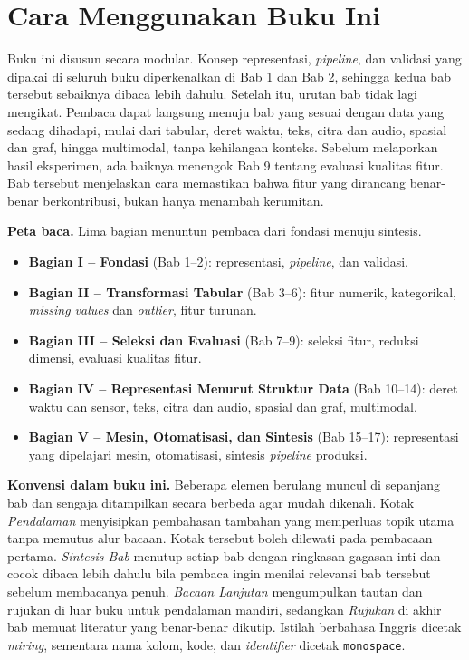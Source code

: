 \chapter*{Cara Menggunakan Buku Ini}

Buku ini disusun secara modular. Konsep representasi, \emph{pipeline}, dan validasi yang dipakai di seluruh buku diperkenalkan di Bab 1 dan Bab 2, sehingga kedua bab tersebut sebaiknya dibaca lebih dahulu. Setelah itu, urutan bab tidak lagi mengikat. Pembaca dapat langsung menuju bab yang sesuai dengan data yang sedang dihadapi, mulai dari tabular, deret waktu, teks, citra dan audio, spasial dan graf, hingga multimodal, tanpa kehilangan konteks. Sebelum melaporkan hasil eksperimen, ada baiknya menengok Bab 9 tentang evaluasi kualitas fitur. Bab tersebut menjelaskan cara memastikan bahwa fitur yang dirancang benar-benar berkontribusi, bukan hanya menambah kerumitan.

\textbf{Peta baca.} Lima bagian menuntun pembaca dari fondasi menuju sintesis.

\begin{itemize}
\tightlist
\item
  \textbf{Bagian I -- Fondasi} (Bab 1--2): representasi, \emph{pipeline}, dan validasi.
\item
  \textbf{Bagian II -- Transformasi Tabular} (Bab 3--6): fitur numerik, kategorikal, \emph{missing values} dan \emph{outlier}, fitur turunan.
\item
  \textbf{Bagian III -- Seleksi dan Evaluasi} (Bab 7--9): seleksi fitur, reduksi dimensi, evaluasi kualitas fitur.
\item
  \textbf{Bagian IV -- Representasi Menurut Struktur Data} (Bab 10--14): deret waktu dan sensor, teks, citra dan audio, spasial dan graf, multimodal.
\item
  \textbf{Bagian V -- Mesin, Otomatisasi, dan Sintesis} (Bab 15--17): representasi yang dipelajari mesin, otomatisasi, sintesis \emph{pipeline} produksi.
\end{itemize}

\textbf{Konvensi dalam buku ini.} Beberapa elemen berulang muncul di sepanjang bab dan sengaja ditampilkan secara berbeda agar mudah dikenali. Kotak \emph{Pendalaman} menyisipkan pembahasan tambahan yang memperluas topik utama tanpa memutus alur bacaan. Kotak tersebut boleh dilewati pada pembacaan pertama. \emph{Sintesis Bab} menutup setiap bab dengan ringkasan gagasan inti dan cocok dibaca lebih dahulu bila pembaca ingin menilai relevansi bab tersebut sebelum membacanya penuh. \emph{Bacaan Lanjutan} mengumpulkan tautan dan rujukan di luar buku untuk pendalaman mandiri, sedangkan \emph{Rujukan} di akhir bab memuat literatur yang benar-benar dikutip. Istilah berbahasa Inggris dicetak \emph{miring}, sementara nama kolom, kode, dan \emph{identifier} dicetak \texttt{monospace}.

